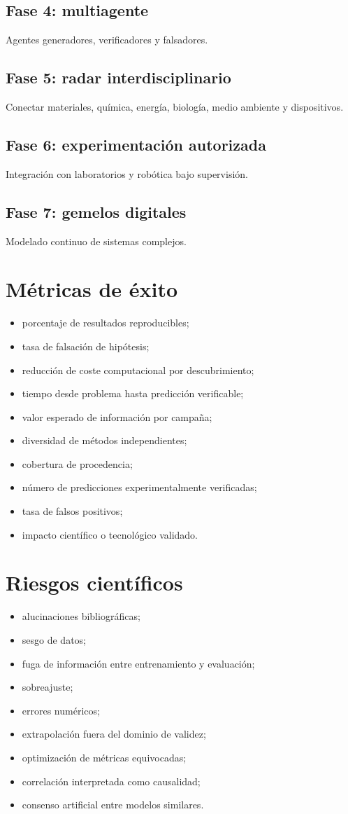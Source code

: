 \documentclass[11pt,a4paper]{article}
\begin{document}
\subsection{Fase 4: multiagente}
Agentes generadores, verificadores y falsadores.
\subsection{Fase 5: radar interdisciplinario}
Conectar materiales, química, energía, biología, medio ambiente y dispositivos.
\subsection{Fase 6: experimentación autorizada}
Integración con laboratorios y robótica bajo supervisión.
\subsection{Fase 7: gemelos digitales}
Modelado continuo de sistemas complejos.

\section{Métricas de éxito}
\begin{itemize}
\item porcentaje de resultados reproducibles;
\item tasa de falsación de hipótesis;
\item reducción de coste computacional por descubrimiento;
\item tiempo desde problema hasta predicción verificable;
\item valor esperado de información por campaña;
\item diversidad de métodos independientes;
\item cobertura de procedencia;
\item número de predicciones experimentalmente verificadas;
\item tasa de falsos positivos;
\item impacto científico o tecnológico validado.
\end{itemize}

\section{Riesgos científicos}
\begin{itemize}
\item alucinaciones bibliográficas;
\item sesgo de datos;
\item fuga de información entre entrenamiento y evaluación;
\item sobreajuste;
\item errores numéricos;
\item extrapolación fuera del dominio de validez;
\item optimización de métricas equivocadas;
\item correlación interpretada como causalidad;
\item consenso artificial entre modelos similares.
\end{itemize}
\end{document}
